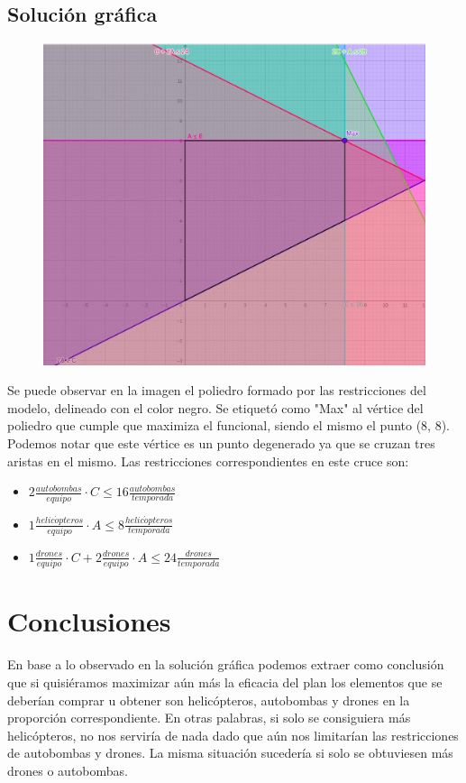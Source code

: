 \documentclass[12pt]{article}
\begin{document}
\resizebox{0.82\textwidth}{!}{\usebox\myv}

\newpage

\subsection{Solución gráfica}

\begin{figure}[htbp]
    \centering
    \includegraphics[width=1\textwidth]{../assets/resolucion-grafica.jpeg}
\end{figure}

Se puede observar en la imagen el poliedro formado por las restricciones del modelo,
delineado con el color negro. Se etiquetó como "Max" al vértice del poliedro que cumple
que maximiza el funcional, siendo el mismo el punto (8, 8). Podemos notar que este
vértice es un punto degenerado ya que se cruzan tres aristas en el mismo. Las restricciones
correspondientes en este cruce son:

\begin{itemize}
    \item $2 \frac{autobombas}{equipo} \cdot C \leq 16 \frac{autobombas}{temporada}$
    \item $1 \frac{helic\acute{o}pteros}{equipo} \cdot A \leq 8 \frac{helic\acute{o}pteros}{temporada}$
    \item $1 \frac{drones}{equipo} \cdot C + 2 \frac{drones}{equipo} \cdot A \leq 24 \frac{drones}{temporada}$
\end{itemize}

\section{Conclusiones}

En base a lo observado en la solución gráfica podemos extraer como conclusión que si quisiéramos maximizar aún más
la eficacia del plan los elementos que se deberían comprar u obtener son helicópteros, autobombas
y drones en la proporción correspondiente. En otras palabras, si solo se consiguiera más helicópteros,
no nos serviría de nada dado que aún nos limitarían las restricciones de autobombas y drones.
La misma situación sucedería si solo se obtuviesen más drones o autobombas.
\end{document}
